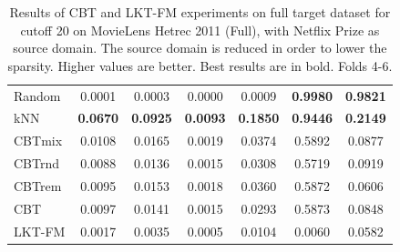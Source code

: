 \begin{table}[hbt]
\begin{tabulary}{\textwidth}{|L|CCCCCC|}
Random & 0.0001 & 0.0003 & 0.0000 & 0.0009 &\textbf{0.9980} & \textbf{0.9821} \\
kNN & \textbf{0.0670} &\textbf{0.0925} &\textbf{0.0093} &\textbf{0.1850} &\textbf{0.9446} & \textbf{0.2149} \\
CBTmix & 0.0108 & 0.0165 & 0.0019 & 0.0374 & 0.5892 & 0.0877 \\
CBTrnd & 0.0088 & 0.0136 & 0.0015 & 0.0308 & 0.5719 & 0.0919 \\
CBTrem & 0.0095 & 0.0153 & 0.0018 & 0.0360 & 0.5872 & 0.0606 \\
CBT & 0.0097 & 0.0141 & 0.0015 & 0.0293 & 0.5873 & 0.0848 \\
LKT-FM & 0.0017 & 0.0035 & 0.0005 & 0.0104 & 0.0060 & 0.0582 \\
\hline
\end{tabulary}
\caption{Results of CBT and LKT-FM experiments on full target dataset for cutoff 20 on MovieLens Hetrec 2011 (Full), with Netflix Prize as source domain. The source domain is reduced in order to lower the sparsity. Higher values are better. Best results are in bold. Folds 4-6.}
\end{table}

